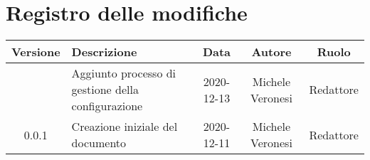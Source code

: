 \section*{Registro delle modifiche}

\begin{center}
	\begin{longtable}{|c|p{5cm}|c|c|c|}
	\hline
	\rowcolor{lighter-grayer}
	\textbf{Versione} & \textbf{Descrizione} & \textbf{Data} & \textbf{Autore} & \textbf{Ruolo} \\
	\hline
	\endfirsthead


	\hline
	\docVersione & Aggiunto processo di gestione della configurazione & 2020-12-13 & Michele Veronesi & Redattore \\
	0.0.1 & Creazione iniziale del documento & 2020-12-11 & Michele Veronesi & Redattore \\
	\hline

	\end{longtable}
\end{center}